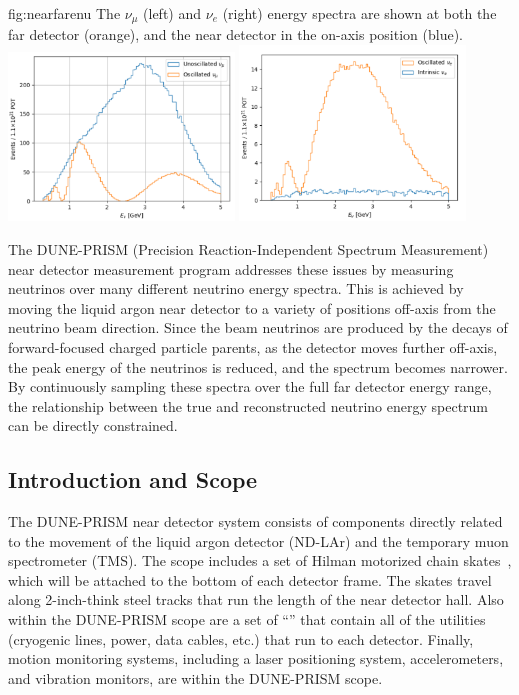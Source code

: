 \begin{dunefigure}{fig:nearfarenu}
{The $\nu_\mu$ (left) and $\nu_e$ (right) energy spectra are shown at both the far detector (orange), and the near detector in the on-axis position (blue).}
\includegraphics[width=0.45\textwidth]{graphics/prism/numuflux.pdf}
\includegraphics[width=0.45\textwidth]{graphics/prism/nueflux.pdf}
\end{dunefigure}

The DUNE-PRISM (Precision Reaction-Independent Spectrum Measurement) near detector measurement program addresses these issues by measuring neutrinos over many different neutrino energy spectra. This is achieved by moving the liquid argon near detector to a variety of positions off-axis from the neutrino beam direction. Since the beam neutrinos are produced by the decays of forward-focused charged particle parents, as the detector moves further off-axis, the peak energy of the neutrinos is reduced, and the spectrum becomes narrower. By continuously sampling these spectra over the full far detector energy range, the relationship between the true and reconstructed neutrino energy spectrum can be directly constrained.

\subsection{Introduction and Scope}
\label{sec:prism-ovvw-intro}

The DUNE-PRISM near detector system consists of components directly related to the movement of the liquid argon detector (ND-LAr) and the temporary muon spectrometer (TMS). The scope includes a set of Hilman motorized chain skates~\cite{hilmanpatent}, which will be attached to the bottom of each detector frame. The skates travel along 2-inch-think steel tracks that run the length of the near detector hall. Also within the DUNE-PRISM scope are a set of ``'' that contain all of the utilities (cryogenic lines, power, data cables, etc.) that run to each detector. Finally, motion monitoring systems, including a laser positioning system, accelerometers, and vibration monitors, are within the DUNE-PRISM scope.

